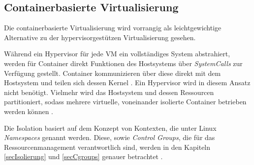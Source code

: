 \documentclass[../main.tex]{subfiles}
\begin{document}








    \subsection{Containerbasierte Virtualisierung}
    \label{introVirtContainer}
      Die containerbasierte Virtualisierung wird vorrangig als leichtgewichtige Alternative zu der hypervisorgestützen Virtualisierung gesehen\cite[S.2]{containerVirtPerformance}.

			Während ein Hypervisor für jede \acrshort{VM} ein vollständiges System abstrahiert, werden für Container direkt Funktionen des Hostsystems über \emph{\glspl{SystemCall}} zur Verfügung gestellt. Container kommunizieren über diese direkt mit dem Hostsystem und teilen sich dessen Kernel \cite[S.6f.]{dockerBook}\cite[S.2]{containerVirtPerformance}. Ein Hypervisor wird in diesem Ansatz nicht benötigt. Vielmehr wird das Hostsystem und dessen Ressourcen partitioniert, sodass mehrere virtuelle, voneinander isolierte Container betrieben werden können \cite[S.3]{dockerSecIntro}\cite[S.1]{dockerSec2}.

			Die Isolation basiert auf dem Konzept von Kontexten, die unter Linux \emph{Namespaces} genannt werden. Diese, sowie \emph{Control Groups}, die für das Ressourcenmanagement verantwortlich sind, werden in den Kapiteln \ref{secIsolierung} und \ref{secCgroups} genauer betrachtet \cite[S.4]{dockerSecIntro}.
\end{document}
